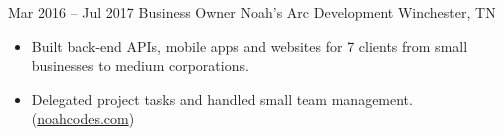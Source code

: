 \documentclass[letterpaper]{moderncv}        %
\begin{document}
\cventry
{Mar 2016 -- Jul 2017}
{Business Owner}
{Noah's Arc Development}
{Winchester, TN}
{}
{\begin{itemize}%
	\item  Built back-end APIs, mobile apps and websites for 7 clients from small businesses to medium corporations.
	\item  Delegated project tasks and handled small team management. (\href{https://noahcodes.com/}{noahcodes.com})
	\end{itemize}}
\iffalse
\cventry
{May 2015 -- Jun 2017}
{Web Store Admin}
{The Mountain Outfitter's}
{Monteagle, TN}
{}
{\begin{itemize}%
	\item  Executed multiple full site server migrations and data recovery after attempted hack.
	\item  Setup Yii (PHP) based CMS and inventory management system and improved checkout flow.
	\item  Additional payment option integration led to 30\% more transactions.
	\end{itemize}}
\fi
\iffalse
\cventry
{May 2015 -- Sep 2015}
{Computer Science Teacher}
{PEN Foundation}
{Winchester, TN}
{}
{\begin{itemize}%
	\item  Crafted individualized lessons from fundamentals to machine vision for 40 students and built a Wordpress site with lessons for at home learning. Taught K-12 students each Saturday at Winchester Public Library.
	\end{itemize}}
\fi
\end{document}
